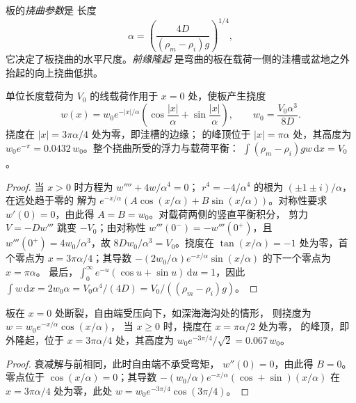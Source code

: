 \begin{definition}\label{def:b3:gravity-geodesy:alpha}
板的\emph{挠曲参数}是
长度
\[
  \alpha = \left(\frac{4D}{(\rho_m - \rho_i)g}\right)^{1/4},
\]
它决定了板挠曲的水平尺度。\emph{前缘隆起}
是弯曲的板在载荷一侧的洼槽或盆地之外
抬起的向上挠曲低拱。
\end{definition}

\begin{proposition}[连续板上的线载荷]\label{prop:b3:gravity-geodesy:line}
单位长度载荷为 $V_0$ 的线载荷作用于 $x = 0$ 处，使板产生挠度
\[
  w(x) = w_0e^{-|x|/\alpha}\left(\cos\frac{|x|}{\alpha} + \sin\frac{|x|}{\alpha}\right),
  \qquad w_0 = \frac{V_0\alpha^3}{8D} .
\]
挠度在 $|x| = 3\pi\alpha/4$ 处为零，即洼槽的边缘；
的峰顶位于 $|x| = \pi\alpha$ 处，其高度为 $w_0e^{-\pi} =
\num{0.0432}\,w_0$。整个挠曲所受的浮力与载荷平衡：
$\int(\rho_m - \rho_i)gw\,\mathrm dx = V_0$。
\end{proposition}

\begin{proof}
当 $x > 0$ 时方程为 $w'''' + 4w/\alpha^4 = 0$；
$r^4 = -4/\alpha^4$ 的根为 $(\pm1 \pm i)/\alpha$，在远处趋于零的
解为 $e^{-x/\alpha}(A\cos(x/\alpha) + B\sin(x/\alpha))$。对称性要求
$w'(0) = 0$，由此得 $A = B = w_0$。对载荷两侧的竖直平衡积分，
剪力 $V = -Dw'''$ 跳变 $-V_0$；由对称性
$w'''(0^-) = -w'''(0^+)$，且 $w'''(0^+) = 4w_0/\alpha^3$，故 $8Dw_0/\alpha^3 =
V_0$。挠度在 $\tan(x/\alpha) =
-1$ 处为零，首个零点为 $x = 3\pi\alpha/4$；其导数
$-(2w_0/\alpha)e^{-x/\alpha}\sin(x/\alpha)$ 的下一个零点为 $x = \pi\alpha$。
最后，$\int_0^\infty e^{-u}(\cos u + \sin u)\,\mathrm du = 1$，因此
$\int w\,\mathrm dx = 2w_0\alpha = V_0\alpha^4/(4D) = V_0/((\rho_m - \rho_i)g)$。
\end{proof}

\begin{proposition}[断裂板]\label{prop:b3:gravity-geodesy:broken}
板在 $x = 0$ 处断裂，自由端受压向下，如深海海沟处的情形，
则挠度为 $w = w_0e^{-x/\alpha}\cos(x/\alpha)$，
当 $x \ge 0$ 时，挠度在 $x = \pi\alpha/2$ 处为零，
的峰顶，即外隆起，位于 $x = 3\pi\alpha/4$ 处，其高度为 $w_0e^{-3\pi/4}/\sqrt2 =
\num{0.067}\,w_0$。
\end{proposition}

\begin{proof}
衰减解与前相同，此时自由端不承受弯矩，
$w''(0) = 0$，由此得 $B = 0$。零点位于 $\cos(x/\alpha) = 0$；其导数
$-(w_0/\alpha)e^{-x/\alpha}(\cos + \sin)(x/\alpha)$ 在
$x = 3\pi\alpha/4$ 处为零，此处 $w = w_0e^{-3\pi/4}\cos(3\pi/4)$。
\end{proof}

